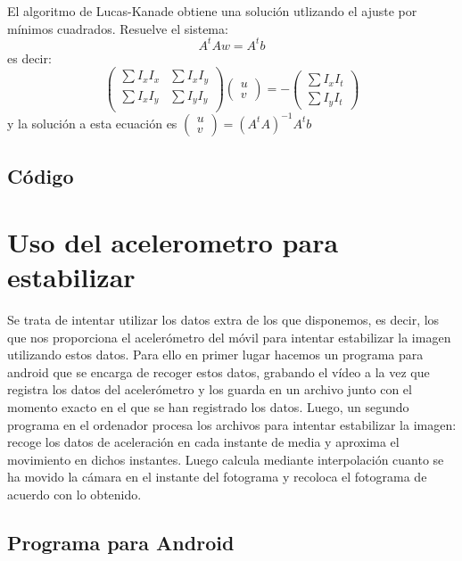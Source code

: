 \documentclass[a4paper,openright, 12pt]{book}
\begin{document}
El algoritmo de Lucas-Kanade obtiene una solución utlizando el ajuste por mínimos cuadrados. Resuelve el sistema:
\begin{equation*}
A^t Aw=A^t b
\end{equation*}
es decir:
\begin{equation*}
\left(
\begin{matrix}
\sum I_x I_x & \sum I_x I_y\\
\sum I_x I_y & \sum I_y I_y\\
\end{matrix}
\right)
\left(\begin{array}{c}u\\v\end{array}\right)
=
- \left(\begin{array}{c} \sum I_x I_t\\ \sum I_y I_t\end{array}\right)
\end{equation*}
y la solución a esta ecuación es $\left(\begin{array}{c}u\\v\end{array}\right) = (A^t A)^{-1} A^t b $  
\newpage
\subsection{Código}


\section{Uso del acelerometro para estabilizar}
Se trata de intentar utilizar los datos extra de los que disponemos, es decir, los que nos proporciona el acelerómetro del móvil para intentar estabilizar la imagen utilizando estos datos.
Para ello en primer lugar hacemos un programa para android que se encarga de recoger estos datos, grabando el vídeo a la vez que registra los datos del acelerómetro y los guarda en un archivo junto con el momento exacto en el que se han registrado los datos.
Luego, un segundo programa en el ordenador procesa los archivos para intentar estabilizar la imagen: recoge los datos de aceleración en cada instante de media y aproxima el movimiento en dichos instantes. Luego calcula mediante interpolación cuanto se ha movido la cámara en el instante del fotograma y recoloca el fotograma de acuerdo con lo obtenido.

\subsection{Programa para Android}
\end{document}
